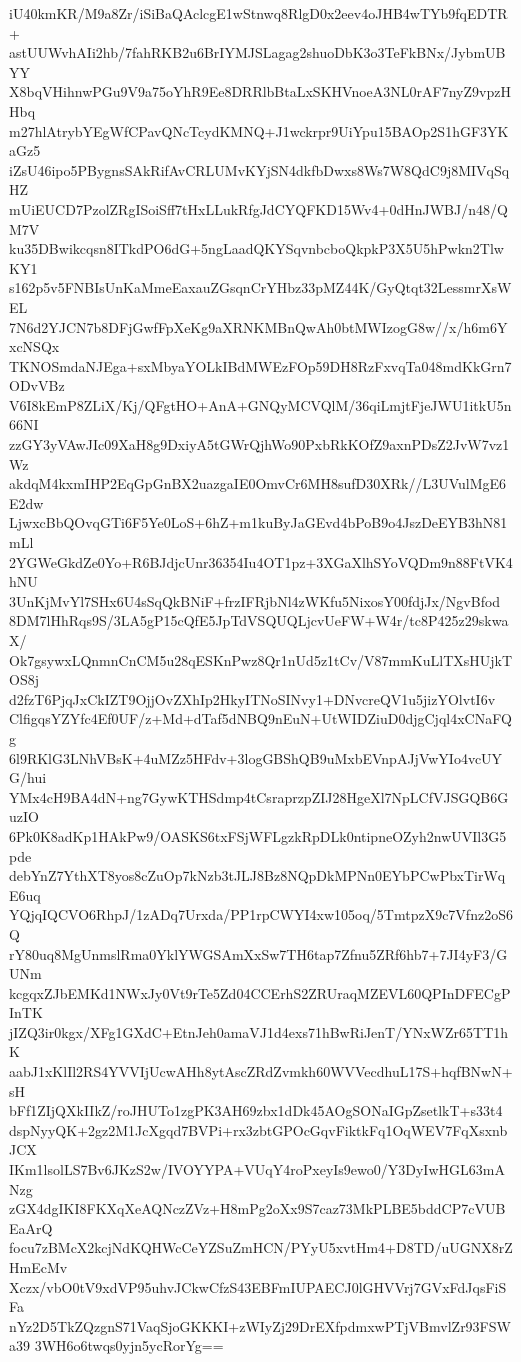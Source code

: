 iU40kmKR/M9a8Zr/iSiBaQAclcgE1wStnwq8RlgD0x2eev4oJHB4wTYb9fqEDTR+
astUUWvhAIi2hb/7fahRKB2u6BrIYMJSLagag2shuoDbK3o3TeFkBNx/JybmUBYY
X8bqVHihnwPGu9V9a75oYhR9Ee8DRRlbBtaLxSKHVnoeA3NL0rAF7nyZ9vpzHHbq
m27hlAtrybYEgWfCPavQNcTcydKMNQ+J1wckrpr9UiYpu15BAOp2S1hGF3YKaGz5
iZsU46ipo5PBygnsSAkRifAvCRLUMvKYjSN4dkfbDwxs8Ws7W8QdC9j8MIVqSqHZ
mUiEUCD7PzolZRgISoiSff7tHxLLukRfgJdCYQFKD15Wv4+0dHnJWBJ/n48/QM7V
ku35DBwikcqsn8ITkdPO6dG+5ngLaadQKYSqvnbcboQkpkP3X5U5hPwkn2TlwKY1
s162p5v5FNBIsUnKaMmeEaxauZGsqnCrYHbz33pMZ44K/GyQtqt32LessmrXsWEL
7N6d2YJCN7b8DFjGwfFpXeKg9aXRNKMBnQwAh0btMWIzogG8w//x/h6m6YxcNSQx
TKNOSmdaNJEga+sxMbyaYOLkIBdMWEzFOp59DH8RzFxvqTa048mdKkGrn7ODvVBz
V6I8kEmP8ZLiX/Kj/QFgtHO+AnA+GNQyMCVQlM/36qiLmjtFjeJWU1itkU5n66NI
zzGY3yVAwJIc09XaH8g9DxiyA5tGWrQjhWo90PxbRkKOfZ9axnPDsZ2JvW7vz1Wz
akdqM4kxmIHP2EqGpGnBX2uazgaIE0OmvCr6MH8sufD30XRk//L3UVulMgE6E2dw
LjwxcBbQOvqGTi6F5Ye0LoS+6hZ+m1kuByJaGEvd4bPoB9o4JszDeEYB3hN81mLl
2YGWeGkdZe0Yo+R6BJdjcUnr36354Iu4OT1pz+3XGaXlhSYoVQDm9n88FtVK4hNU
3UnKjMvYl7SHx6U4sSqQkBNiF+frzIFRjbNl4zWKfu5NixosY00fdjJx/NgvBfod
8DM7lHhRqs9S/3LA5gP15cQfE5JpTdVSQUQLjcvUeFW+W4r/tc8P425z29skwaX/
Ok7gsywxLQnmnCnCM5u28qESKnPwz8Qr1nUd5z1tCv/V87mmKuLlTXsHUjkTOS8j
d2fzT6PjqJxCkIZT9OjjOvZXhIp2HkyITNoSINvy1+DNvcreQV1u5jizYOlvtI6v
ClfigqsYZYfc4Ef0UF/z+Md+dTaf5dNBQ9nEuN+UtWIDZiuD0djgCjql4xCNaFQg
6l9RKlG3LNhVBsK+4uMZz5HFdv+3logGBShQB9uMxbEVnpAJjVwYIo4vcUYG/hui
YMx4cH9BA4dN+ng7GywKTHSdmp4tCsraprzpZIJ28HgeXl7NpLCfVJSGQB6GuzIO
6Pk0K8adKp1HAkPw9/OASKS6txFSjWFLgzkRpDLk0ntipneOZyh2nwUVIl3G5pde
debYnZ7YthXT8yos8cZuOp7kNzb3tJLJ8Bz8NQpDkMPNn0EYbPCwPbxTirWqE6uq
YQjqIQCVO6RhpJ/1zADq7Urxda/PP1rpCWYI4xw105oq/5TmtpzX9c7Vfnz2oS6Q
rY80uq8MgUnmslRma0YklYWGSAmXxSw7TH6tap7Zfnu5ZRf6hb7+7JI4yF3/GUNm
kcgqxZJbEMKd1NWxJy0Vt9rTe5Zd04CCErhS2ZRUraqMZEVL60QPInDFECgPInTK
jIZQ3ir0kgx/XFg1GXdC+EtnJeh0amaVJ1d4exs71hBwRiJenT/YNxWZr65TT1hK
aabJ1xKlIl2RS4YVVIjUcwAHh8ytAscZRdZvmkh60WVVecdhuL17S+hqfBNwN+sH
bFf1ZIjQXkIIkZ/roJHUTo1zgPK3AH69zbx1dDk45AOgSONaIGpZsetlkT+s33t4
dspNyyQK+2gz2M1JcXgqd7BVPi+rx3zbtGPOcGqvFiktkFq1OqWEV7FqXsxnbJCX
IKm1lsolLS7Bv6JKzS2w/IVOYYPA+VUqY4roPxeyIs9ewo0/Y3DyIwHGL63mANzg
zGX4dgIKI8FKXqXeAQNczZVz+H8mPg2oXx9S7caz73MkPLBE5bddCP7cVUBEaArQ
focu7zBMcX2kcjNdKQHWcCeYZSuZmHCN/PYyU5xvtHm4+D8TD/uUGNX8rZHmEcMv
Xczx/vbO0tV9xdVP95uhvJCkwCfzS43EBFmIUPAECJ0lGHVVrj7GVxFdJqsFiSFa
nYz2D5TkZQzgnS71VaqSjoGKKKI+zWIyZj29DrEXfpdmxwPTjVBmvlZr93FSWa39
3WH6o6twqs0yjn5ycRorYg==
